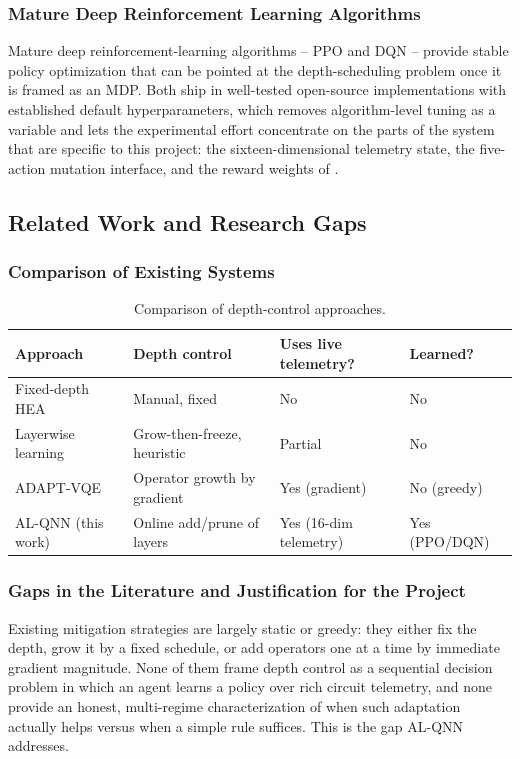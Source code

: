\subsubsection{Mature Deep Reinforcement Learning Algorithms}
Mature deep reinforcement-learning algorithms -- PPO \citep{schulman2017proximal} and DQN \citep{mnih2015human} -- provide stable policy optimization that can be pointed at the depth-scheduling problem once it is framed as an MDP. Both ship in well-tested open-source implementations with established default hyperparameters, which removes algorithm-level tuning as a variable and lets the experimental effort concentrate on the parts of the system that are specific to this project: the sixteen-dimensional telemetry state, the five-action mutation interface, and the reward weights of .

\subsection{Related Work and Research Gaps}

\subsubsection{Comparison of Existing Systems}
\begin{table}[htbp]
\centering
\caption{Comparison of depth-control approaches.}
\label{tab:comparison}
\begin{tabular}{|p{3cm}|p{3.5cm}|p{2.7cm}|p{2.8cm}|}
\hline
\textbf{Approach} & \textbf{Depth control} & \textbf{Uses live telemetry?} & \textbf{Learned?} \\
\hline
Fixed-depth HEA & Manual, fixed & No & No \\
Layerwise learning & Grow-then-freeze, heuristic & Partial & No \\
ADAPT-VQE & Operator growth by gradient & Yes (gradient) & No (greedy) \\
AL-QNN (this work) & Online add/prune of layers & Yes (16-dim telemetry) & Yes (PPO/DQN) \\
\hline
\end{tabular}
\end{table}

\subsubsection{Gaps in the Literature and Justification for the Project}
Existing mitigation strategies are largely static or greedy: they either fix the depth, grow it by a fixed schedule, or add operators one at a time by immediate gradient magnitude. None of them frame depth control as a sequential decision problem in which an agent learns a policy over rich circuit telemetry, and none provide an honest, multi-regime characterization of when such adaptation actually helps versus when a simple rule suffices. This is the gap AL-QNN addresses.

